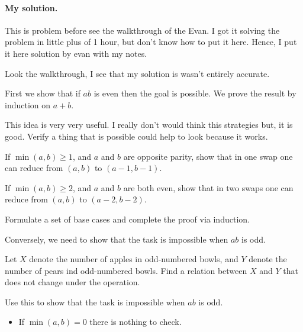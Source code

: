 \documentclass[11pt]{scrartcl}
\begin{document}
\paragraph{My solution.} This is problem before see the walkthrough of the Evan. I got it solving the problem in little
plus of 1 hour, but don't know how to put it here. Hence, I put it here solution by evan with my notes.\par
Look the walkthrough, I see that my solution is wasn't entirely accurate.

\begin{soln}
\item\textbf{\color{green!15!darkgray}{Walkthrough.}}  First we show that if $ab$ is even then the goal is possible. We prove the result by induction on $a + b$.

\begin{remark}
  This idea is very very useful. I really don't would think this strategies but, it is good. Verify a thing that is
  possible could help to look because it works.
\end{remark}

\begin{walk}
\item If $\min(a,b) \ge 1$, and $a$ and $b$ are opposite parity, show that in one swap one can reduce from $(a,b)$
to $(a-1,b-1)$.

\item If $\min (a,b) \ge 2$, and $a$ and $b$ are both even, show that in two swaps one can reduce from $(a,b)$ to
$(a-2,b-2)$.

\item Formulate a set of base cases and complete the proof via induction.
\end{walk}
Conversely, we need to show that the task is impossible when $ab$ is odd.

\begin{walk}[start=4]
\item Let $X$ denote the number of apples in odd-numbered bowls, and $Y$  denote the number of pears ind odd-numbered
bowls. Find a relation between $X$ and $Y$ that does not change under the operation.

\item Use this to show that the task is impossible when $ab$ is odd.
\end{walk}

\item\textbf{\color{red!40!darkgray}{Solution.}}

\begin{itemize}
\item If $\min(a,b) =0$ there is nothing to check.


\end{itemize}
\end{soln}
\end{document}
